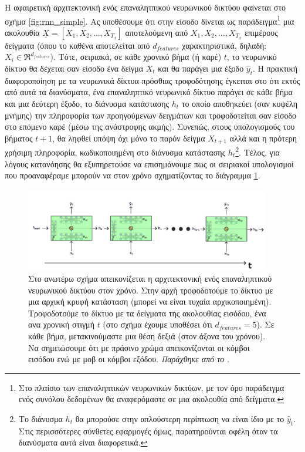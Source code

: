 Η αφαιρετική αρχιτεκτονική ενός επαναλητπικού νευρωνικού δικτύου φαίνεται στο σχήμα \ref{fig:rnn_simple}. Ας υποθέσουμε ότι στην είσοδο δίνεται ως παράδειγμα\footnote{Στο πλαίσιο των επαναληπτικών νευρωνικών δικτύων, με τον όρο παράδειγμα ενός συνόλου δεδομένων θα αναφερόμαστε σε μια ακολουθία από δείγματα.} μια ακολουθία $\underline{X} = [X_1, X_2, \dots, X_{T_x}]$ αποτελούμενη από $X_1, X_2, \dots, X_{T_x}$ επιμέρους δείγματα (όπου το καθένα αποτελείται από $d_{features}$ χαρακτηριστικά, δηλαδή: $X_i \in \Re^{d_{features}}$). Τότε, σειριακά, σε κάθε χρονικό βήμα (ή καρέ) $t$, το νευρωνικό δίκτυο θα δέχεται σαν είσοδο ένα δείγμα $X_t$ και θα παράγει μια έξοδο $\hat{y}_t$. Η πρακτική διαφοροποίηση με τα νευρωνικά δίκτυα πρόσθιας τροφοδότησης έγκειται στο ότι εκτός από αυτά τα διανύσματα, ένα επαναληπτικό νευρωνικό δίκτυο παράγει σε κάθε βήμα και μια δεύτερη έξοδο, το διάνυσμα κατάστασης $h_{t}$ το οποίο αποθηκεύει (σαν κυψέλη μνήμης) την πληροφορία των προηγούμενων δειγμάτων και τροφοδοτείται σαν είσοδο στο επόμενο καρέ (μέσω της ανάστροφης ακμής). Συνεπώς, στους υπολογισμούς του βήματος $t+1$, θα ληφθεί υπόψη όχι μόνο το παρόν δείγμα $X_{t+1}$ αλλά και η πρότερη χρήσιμη πληροφορία, κωδικοποιημένη στο διάνυσμα κατάστασης $h_{t}$\footnote{Το διάνυσμα $h_{t}$ θα μπορούσε στην απλούστερη περίπτωση να είναι ίδιο με το $\hat{y}_{t}$. Στις περισσότερες σύνθετες εφαρμογές όμως, παρατηρούνται οφέλη όταν τα διανύσματα αυτά είναι διαφορετικά.}. Τέλος, για λόγους κατανόησης θα εξυπηρετούσε να επισημάνουμε πως οι σειριακοί υπολογισμοί που προαναφέραμε μπορούν να  στον χρόνο σχηματίζοντας το διάγραμμα \ref{fig:rnn_unrolled}.\par

\begin{figure}[h]
  \centering
  \includegraphics[width=0.95\textwidth]{images/chapter theoritical background/rnn_unroled.pdf}
  \caption{Στο ανωτέρω σχήμα απεικονίζεται η αρχιτεκτονική ενός επαναληπτικού νευρωνικού δικτύου  στον χρόνο. Στην αρχή τροφοδοτούμε το δίκτυο με μια αρχική κρυφή κατάσταση (μπορεί να είναι τυχαία αρχικοποιημένη). Τροφοδοτούμε το δίκτυο με τα δείγματα της ακολουθίας εισόδου, ένα ανα χρονική στιγμή $t$ (στο σχήμα έχουμε υποθέσει ότι $d_{features} = 5$). Σε κάθε βήμα, μετακινούμαστε μια θέση δεξιά (στον άξονα του χρόνου). Να σημειώσουμε ότι με πράσινο χρώμα απεικονίζονται οι κόμβοι εισόδου ενώ με μοβ οι κόμβοι εξόδου. \textit{Παράχθηκε από το \href{https://inkscape.org/}{}}.}
  \label{fig:rnn_unrolled}
\end{figure}


